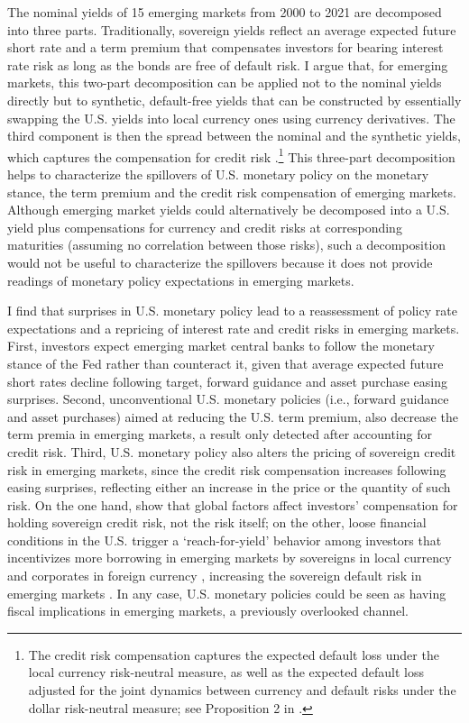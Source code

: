 \documentclass[a4paper, 12pt]{article}
\begin{document}
The nominal yields of 15 emerging markets from 2000 to 2021 are decomposed into three parts. Traditionally, sovereign yields reflect an average expected future short rate and a term premium that compensates investors for bearing interest rate risk as long as the bonds are free of default risk. I argue that, for emerging markets, this two-part decomposition can be applied not to the nominal yields directly but to synthetic, default-free yields that can be constructed by essentially swapping the U.S. yields into local currency ones using currency derivatives. The third component is then the spread between the nominal and the synthetic yields, which captures the compensation for credit risk \citep{DuSchreger:2016JoF}.\footnote{The credit risk compensation captures the expected default loss under the local currency risk-neutral measure, as well as the expected default loss adjusted for the joint dynamics between currency and default risks under the dollar risk-neutral measure; see Proposition 2 in \cite{DuSchreger:2016JoF}.} This three-part decomposition helps to characterize the spillovers of U.S. monetary policy on the monetary stance, the term premium and the credit risk compensation of emerging markets. Although emerging market yields could alternatively be decomposed into a U.S. yield plus compensations for currency and credit risks at corresponding maturities (assuming no correlation between those risks), such a decomposition would not be useful to characterize the spillovers because it does not provide readings of monetary policy expectations in emerging markets. 

I find that surprises in U.S. monetary policy lead to a reassessment of policy rate expectations and a repricing of interest rate and credit risks in emerging markets. First, investors expect emerging market central banks to follow the monetary stance of the Fed rather than counteract it, given that average expected future short rates decline following target, forward guidance and asset purchase easing surprises. Second, unconventional U.S. monetary policies (i.e., forward guidance and asset purchases) aimed at reducing the U.S. term premium, also decrease the term premia in emerging markets, a result only detected after accounting for credit risk. Third, U.S. monetary policy also alters the pricing of sovereign credit risk in emerging markets, since the credit risk compensation increases following easing surprises, reflecting either an increase in the price or the quantity of such risk. On the one hand, \cite{JeanneretSouissi:2016} show that global factors affect investors’ compensation for holding sovereign credit risk, not the risk itself; on the other, loose financial conditions in the U.S. trigger a `reach-for-yield' behavior among investors \citep{HausmanWongswan:2011} that incentivizes more borrowing in emerging markets by sovereigns in local currency \citep{BigioNunoPassadore:2018} and corporates in foreign currency \citep{Turner:2014}, increasing the sovereign default risk in emerging markets \citep{DuSchreger:2022RFS}. In any case, U.S. monetary policies could be seen as having fiscal implications in emerging markets, a previously overlooked channel. 
\end{document}
